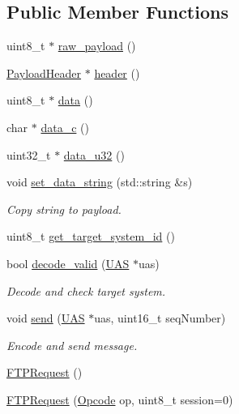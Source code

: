 \subsection*{Public Member Functions}
\begin{DoxyCompactItemize}
\item 
uint8\+\_\+t $\ast$ \mbox{\hyperlink{group__plugin_ga5db0f34c632d274bb013df23cb8aa362}{raw\+\_\+payload}} ()
\item 
\mbox{\hyperlink{structmavros_1_1std__plugins_1_1FTPRequest_1_1PayloadHeader}{Payload\+Header}} $\ast$ \mbox{\hyperlink{group__plugin_gacb2fd6b1a67b8f6d182b943f64af8802}{header}} ()
\item 
uint8\+\_\+t $\ast$ \mbox{\hyperlink{group__plugin_ga8624be9f0794a1e686a06f68fe405bcd}{data}} ()
\item 
char $\ast$ \mbox{\hyperlink{group__plugin_ga0786d26298e7a59ee7e22d9bc0c7f7b1}{data\+\_\+c}} ()
\item 
uint32\+\_\+t $\ast$ \mbox{\hyperlink{group__plugin_gae1a0d86b63b05cad94daaaf57bd30a60}{data\+\_\+u32}} ()
\item 
void \mbox{\hyperlink{group__plugin_ga79bbc1bfe041055051a72f5c1efb630d}{set\+\_\+data\+\_\+string}} (std\+::string \&s)
\begin{DoxyCompactList}\small\item\em Copy string to payload. \end{DoxyCompactList}\item 
uint8\+\_\+t \mbox{\hyperlink{group__plugin_ga49ae6323933afa8b164aaffccb798a0a}{get\+\_\+target\+\_\+system\+\_\+id}} ()
\item 
bool \mbox{\hyperlink{group__plugin_gab4fea3506785f409afdfb0917bab879f}{decode\+\_\+valid}} (\mbox{\hyperlink{classmavros_1_1UAS}{U\+AS}} $\ast$uas)
\begin{DoxyCompactList}\small\item\em Decode and check target system. \end{DoxyCompactList}\item 
void \mbox{\hyperlink{group__plugin_gadc186f416bee256e70ceecb927d3a135}{send}} (\mbox{\hyperlink{classmavros_1_1UAS}{U\+AS}} $\ast$uas, uint16\+\_\+t seq\+Number)
\begin{DoxyCompactList}\small\item\em Encode and send message. \end{DoxyCompactList}\item 
\mbox{\hyperlink{group__plugin_ga65eec8a4ea0ca2018dab26b891c6cd6b}{F\+T\+P\+Request}} ()
\item 
\mbox{\hyperlink{group__plugin_gafaf43c2f853d7c01415db8b820e6390c}{F\+T\+P\+Request}} (\mbox{\hyperlink{group__plugin_gaa250490cd75da57eb00865e70210f672}{Opcode}} op, uint8\+\_\+t session=0)
\end{DoxyCompactItemize}
